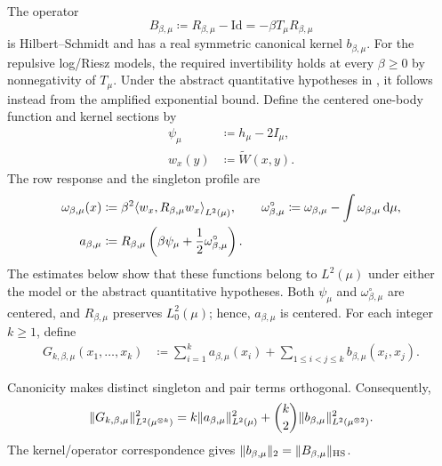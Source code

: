 \documentclass[11pt,reqno]{amsart}
\numberwithin{equation}{section}
\theoremstyle{plain}
\theoremstyle{remark}
\DeclarePairedDelimiter{\norm}{\lVert}{\rVert}
\DeclarePairedDelimiter{\ipp}{\langle}{\rangle}
\newcommand{\md}{\mathrm{d}}
\newcommand{\tl}{\widetilde}
\newcommand{\be}{\beta}
\begin{document}
The operator
\begin{equation}\label{eq:quantitative-screened-operator}
 B_{\be,\mu}\coloneqq R_{\be,\mu}-\mathrm{Id}=-\be T_\mu R_{\be,\mu}
\end{equation}
is Hilbert--Schmidt and has a real symmetric canonical kernel $b_{\be,\mu}$.  For the repulsive log/Riesz models, the required invertibility holds at every $\be\geq0$ by nonnegativity of $T_\mu$.  Under the abstract quantitative hypotheses in , it follows instead from the amplified exponential bound.  Define the centered one-body function and kernel sections by
\begin{align}
 \psi_\mu&\coloneqq h_\mu-2I_\mu,\label{eq:exact-psi-def}\\
 w_x(y)&\coloneqq\tl W(x,y).\label{eq:exact-row-def}
\end{align}
The row response and the singleton profile are
\begin{align}
 \omega_{\be,\mu}(x)
 &\coloneqq\be^2\ipp*{w_x,R_{\be,\mu}w_x}_{L^2(\mu)},
 \qquad
 \omega_{\be,\mu}^{\circ}
 \coloneqq\omega_{\be,\mu}-\int\omega_{\be,\mu}\,\md\mu,
 \label{eq:exact-omega-def}\\
 a_{\be,\mu}
 &\coloneqq R_{\be,\mu}\left(\be\psi_\mu+\frac12\omega_{\be,\mu}^{\circ}\right).
 \label{eq:exact-singleton-profile-def}
\end{align}
The estimates below show that these functions belong to $L^2(\mu)$ under either the model or the abstract quantitative hypotheses.
  Both $\psi_\mu$ and $\omega_{\be,\mu}^{\circ}$ are centered, and $R_{\be,\mu}$ preserves $L^2_0(\mu)$; hence, $a_{\be,\mu}$ is centered.  For each integer $k\geq1$, define
\begin{align}
 G_{k,\be,\mu}(x_1,\ldots,x_k)
 &\coloneqq\sum_{i=1}^k a_{\be,\mu}(x_i)
 +\sum_{1\leq i<j\leq k}b_{\be,\mu}(x_i,x_j).
 \label{eq:exact-fixed-profile-def}
\end{align}

Canonicity makes distinct singleton and pair terms orthogonal.  Consequently,
\begin{equation}\label{eq:exact-Gk-L2}
 \norm{G_{k,\be,\mu}}_{L^2(\mu^{\otimes k})}^2
 =k\norm{a_{\be,\mu}}_{L^2(\mu)}^2
 +\binom{k}{2}\norm{b_{\be,\mu}}_{L^2(\mu^{\otimes2})}^2.
\end{equation}
The kernel/operator correspondence gives $\norm{b_{\be,\mu}}_2=\norm{B_{\be,\mu}}_{\mathrm{HS}}$.
\end{document}
